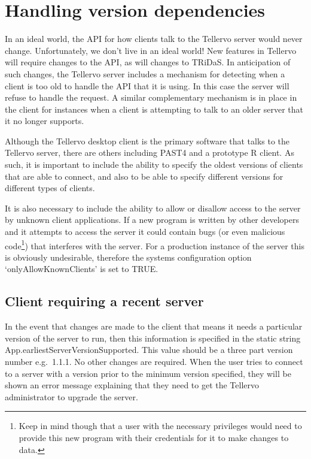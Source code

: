 \section{Handling version dependencies}
In an ideal world, the API for how clients talk to the Tellervo server would never change.  Unfortunately, we don't live in an ideal world!  New features in Tellervo will require changes to the API, as will changes to TRiDaS.  In anticipation of such changes, the Tellervo server includes a mechanism for detecting when a client is too old to handle the API that it is using.  In this case the server will refuse to handle the request.  A similar complementary mechanism is in place in the client for instances when a client is attempting to talk to an older server that it no longer supports.  

Although the Tellervo desktop client is the primary software that talks to the Tellervo server, there are others including PAST4 and a prototype R client.  As such, it is important to include the ability to specify the oldest versions of clients that are able to connect, and also to be able to specify different versions for different types of clients. 

It is also necessary to include the ability to allow or disallow access to the server by unknown client applications.  If a new program is written by other developers and it attempts to access the server it could contain bugs (or even malicious code\footnote{Keep in mind though that a user with the necessary privileges would need to provide this new program with their credentials for it to make changes to data.}) that interferes with the server.  For a production instance of the server this is obviously undesirable, therefore the systems configuration option `onlyAllowKnownClients' is set to TRUE.  

\subsection{Client requiring a recent server}

In the event that changes are made to the client that means it needs a particular version of the server to run, then this information is specified in the static string App.earliestServerVersionSupported.  This value should be a three part version number e.g.\ 1.1.1.  No other changes are required.  When the user tries to connect to a server with a version prior to the minimum version specified, they will be shown an error message explaining that they need to get the Tellervo administrator to upgrade the server.  

